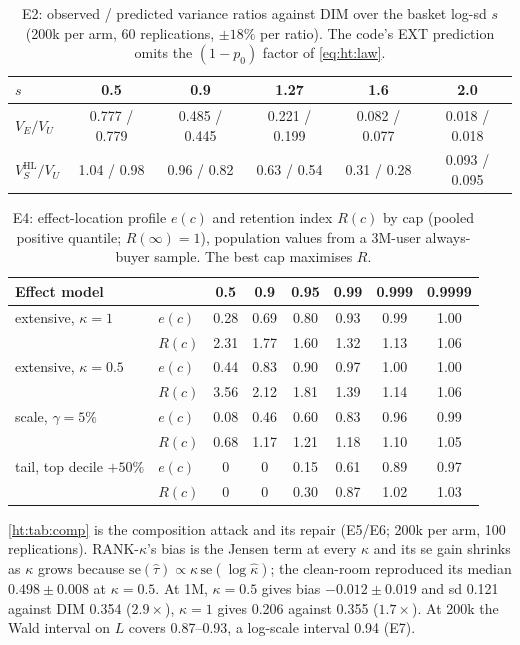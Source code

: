\begin{table}[htbp]
\centering\small
\caption{E2: observed / predicted variance ratios against DIM over the basket log-sd $s$ (200k per arm, 60 replications, $\pm18\%$ per ratio). The code's EXT prediction omits the $(1 - p_0)$ factor of \cref{eq:ht:law}.}
\label{ht:tab:law}
\begin{tabular}{lccccc}
\toprule
$s$ & 0.5 & 0.9 & 1.27 & 1.6 & 2.0 \\
\midrule
$V_E/V_U$ & 0.777 / 0.779 & 0.485 / 0.445 & 0.221 / 0.199 & 0.082 / 0.077 & 0.018 / 0.018 \\
$V_S^{\mathrm{HL}}/V_U$ & 1.04 / 0.98 & 0.96 / 0.82 & 0.63 / 0.54 & 0.31 / 0.28 & 0.093 / 0.095 \\
\bottomrule
\end{tabular}
\end{table}

\begin{table}[htbp]
\centering\footnotesize
\caption{E4: effect-location profile $e(c)$ and retention index $R(c)$ by cap (pooled positive quantile; $R(\infty) = 1$), population values from a 3M-user always-buyer sample. The best cap maximises $R$.}
\label{ht:tab:profile}
\begin{tabular}{llcccccc}
\toprule
Effect model & & 0.5 & 0.9 & 0.95 & 0.99 & 0.999 & 0.9999 \\
\midrule
extensive, $\kappa = 1$ & $e(c)$ & 0.28 & 0.69 & 0.80 & 0.93 & 0.99 & 1.00 \\
 & $R(c)$ & 2.31 & 1.77 & 1.60 & 1.32 & 1.13 & 1.06 \\
extensive, $\kappa = 0.5$ & $e(c)$ & 0.44 & 0.83 & 0.90 & 0.97 & 1.00 & 1.00 \\
 & $R(c)$ & 3.56 & 2.12 & 1.81 & 1.39 & 1.14 & 1.06 \\
scale, $\gamma = 5\%$ & $e(c)$ & 0.08 & 0.46 & 0.60 & 0.83 & 0.96 & 0.99 \\
 & $R(c)$ & 0.68 & 1.17 & 1.21 & 1.18 & 1.10 & 1.05 \\
tail, top decile $+50\%$ & $e(c)$ & 0 & 0 & 0.15 & 0.61 & 0.89 & 0.97 \\
 & $R(c)$ & 0 & 0 & 0.30 & 0.87 & 1.02 & 1.03 \\
\bottomrule
\end{tabular}
\end{table}

\cref{ht:tab:comp} is the composition attack and its repair (E5/E6; 200k per arm, 100 replications). RANK-$\kappa$'s bias is the Jensen term at every $\kappa$ and its se gain shrinks as $\kappa$ grows because $\mathrm{se}(\hat\tau) \propto \kappa\,\mathrm{se}(\log\hat\kappa)$; the clean-room reproduced its median $0.498 \pm 0.008$ at $\kappa = 0.5$. At 1M, $\kappa = 0.5$ gives bias $-0.012 \pm 0.019$ and sd 0.121 against DIM 0.354 ($2.9\times$), $\kappa = 1$ gives 0.206 against 0.355 ($1.7\times$). At 200k the Wald interval on $L$ covers 0.87--0.93, a log-scale interval 0.94 (E7).

